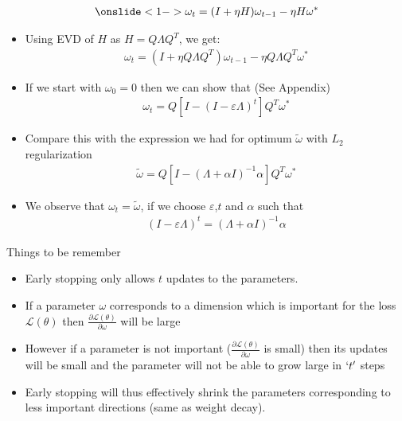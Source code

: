 \begin{frame}
	\begin{align*}
		\onslide<1->\omega_t=(I+\eta H)\omega_{t-1}-\eta H \omega^{*} 
	\end{align*}
	\begin{itemize}
		\justifying
		\item<2-> Using EVD of $H$ as $H=Q \Lambda Q^{T}$, we get:
		\begin{align*}
			\omega_t=(I+\eta Q \Lambda Q^{T} )\omega_{t-1}-\eta Q \Lambda Q^{T} \omega^{*} 
		\end{align*}
		\item<3-> If we start with $\omega_{0}=0$ then we can show that (See Appendix)
		\begin{align*}
			\omega_t=Q[I-(I-\varepsilon \Lambda)^{t}]Q^{T}\omega^{*} 
		\end{align*}
		\item<4-> Compare this with the expression we had for optimum $\tilde{\omega}$ with $L_2$ regularization
		\begin{align*}
			\tilde{\omega}=Q[I-(\Lambda+ \alpha I)^{-1} \alpha]Q^{T}\omega^{*} 
		\end{align*}
		\item<5-> We observe that $\omega_t=\tilde{\omega}$, if we choose $
		\varepsilon$,$t$ and $\alpha$ such that 
		\begin{align*}
			(I-\varepsilon \Lambda)^{t}=(\Lambda+ \alpha I)^{-1} \alpha 
		\end{align*}
	\end{itemize}
\end{frame}

\begin{frame}
	\begin{block}{Things to be remember}
		\begin{itemize}
			\justifying
			\item<1-> Early stopping only allows $t$ updates to the parameters.
			\item<2-> If a parameter $\omega$ corresponds to a dimension which is important for the loss $\mathscr{L}(\theta)$ then $\frac{\partial \mathscr{L}(\theta)}{\partial \omega}$ will be large
			\item<4-> However if a parameter is not important ($\frac{\partial \mathscr{L}(\theta)}{\partial \omega}$ is small) then its updates will be small and the parameter will not be able to grow large in $`t'$ steps
			\item<5-> Early stopping will thus effectively shrink the parameters corresponding to less important directions (same as weight decay).
		\end{itemize}
	\end{block}
\end{frame}
